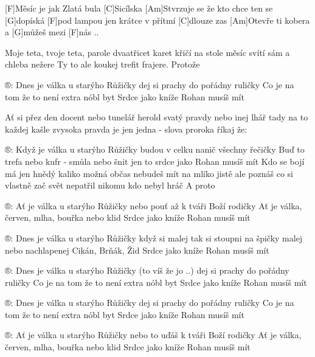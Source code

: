 
[F]Měsíc je jak Zlatá bula [C]Sicílska
[Am]Stvrzuje se že kto chce ten se [G]dopíská
[F]pod lampou jen krátce v přítmí [C]dlouze zas
[Am]Otevře ti kobera a [G]můžeš mezi [F]nás .. 

Moje teta, tvoje teta, parole
dvaatřicet karet křičí na stole
měsíc svítí sám a chleba nežere
Ty to ale koukej trefit frajere.
Protože

®: Dnes je válka u starýho Růžičky
dej si prachy do pořádny ruličky
Co je na tom že to není extra nóbl byt
Srdce jako kníže Rohan musíš mít 

Ať si přez den docent nebo tunelář
herold svatý pravdy nebo inej lhář
tady na to každej kašle zvysoka
pravda je jen jedna - slova proroka říkaj že:

®: Když je válka u starýho Růžičky
budou v celku nanič všechny řečičky
Buď to trefa nebo kufr - smůla nebo šnit
jen to srdce jako Rohan musíš mít
\slpc
Kdo se bojí má jen hnědý kaliko
možná občas nebudeš mít na mlíko
jistě ale poznáš co si vlastně zač
svět nepatřil nikomu kdo nebyl hráč
A proto

®: Ať je válka u starýho Růžičky
nebo pouť až k tváři Boží rodičky
Ať je válka, červen, mlha, bouřka nebo klid
Srdce jako kníže Rohan musíš mít

®: Dnes je válka u starýho Růžičky
když si malej tak si stoupni na špičky
malej nebo nachlapenej Cikán, Brňák, Žid
Srdce jako kníže Rohan musíš mít

®: Dnes je válka u starýho Růžičky (to víš že jo ..)
dej si prachy do pořádny ruličky
Co je na tom že to není extra nóbl byt
Srdce jako kníže Rohan musíš mít

®: Dnes je válka u starýho Růžičky
dej si prachy do pořádny ruličky
Co je na tom že to není extra nóbl byt
Srdce jako kníže Rohan musíš mít

®: Ať je válka u starýho Růžičky
nebo to uďáš k tváři Boží rodičky
Ať je válka, červen, mlha, bouřka nebo klid
Srdce jako kníže Rohan musíš mít
